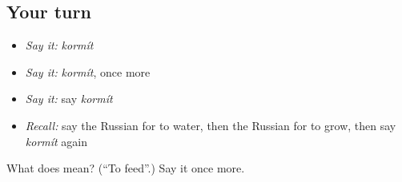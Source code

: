 \subsection*{Your turn}
\begin{itemize}
\raggedright
  \item \emph{Say it:} \emph{kormít}
  \item \emph{Say it:} \emph{kormít}, once more
  \item \emph{Say it:} say \emph{kormít}
  \item \emph{Recall:} say the Russian for to water, then the Russian for to grow, then say \emph{kormít} again
\end{itemize}

\begin{tcolorbox}[breakable,colback=teal!4,colframe=teal!35!black,title={Before you move on}]
What does  mean? (\textquotedblleft{}To feed\textquotedblright{}.) Say it once more.
\end{tcolorbox}
